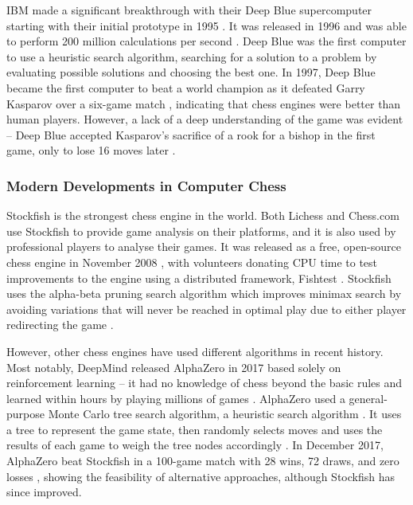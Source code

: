 \documentclass[a4paper, 11pt]{article}
\begin{document}
IBM made a significant breakthrough with their Deep Blue supercomputer starting with their initial prototype in 1995 \cite{hsu1995deep}. It was released in 1996 \cite{hsu1999ibm} and was able to perform 200 million calculations per second \cite{strogatz2018one}. Deep Blue was the first computer to use a heuristic search algorithm, searching for a solution to a problem by evaluating possible solutions and choosing the best one. In 1997, Deep Blue became the first computer to beat a world champion as it defeated Garry Kasparov over a six-game match \cite{seirawan1997implications}, indicating that chess engines were better than human players. However, a lack of a deep understanding of the game was evident -- Deep Blue accepted Kasparov's sacrifice of a rook for a bishop in the first game, only to lose 16 moves later \cite{strogatz2018one}.

\subsubsection{Modern Developments in Computer Chess}
Stockfish is the strongest chess engine in the world. Both Lichess and Chess.com use Stockfish to provide game analysis on their platforms, and it is also used by professional players to analyse their games. It was released as a free, open-source chess engine in November 2008 \cite{aboutStockfish}, with volunteers donating CPU time to test improvements to the engine using a distributed framework, Fishtest \cite{fishtestDistributedTestingFramework}. Stockfish uses the alpha-beta pruning search algorithm which improves minimax search \cite{v1928theorie} by avoiding variations that will never be reached in optimal play due to either player redirecting the game \cite{maharaj2022chess}.

However, other chess engines have used different algorithms in recent history. Most notably, DeepMind released AlphaZero in 2017 \cite{silver2017mastering2} based solely on reinforcement learning -- it had no knowledge of chess beyond the basic rules and learned within hours by playing millions of games \cite{strogatz2018one}. AlphaZero used a general-purpose Monte Carlo tree search algorithm, a heuristic search algorithm \cite{silver2017mastering2}. It uses a tree to represent the game state, then randomly selects moves and uses the results of each game to weigh the tree nodes accordingly \cite{chaslot2008monte}. In December 2017, AlphaZero beat Stockfish in a 100-game match with 28 wins, 72 draws, and zero losses \cite{klein2017google}, showing the feasibility of alternative approaches, although Stockfish has since improved.
\end{document}
